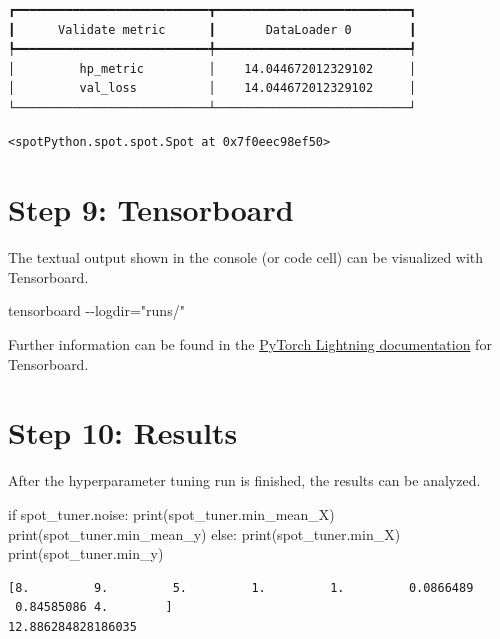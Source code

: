 \documentclass[
  letterpaper,
  DIV=11,
  numbers=noendperiod]{scrreprt}
\newenvironment{Shaded}{\begin{snugshade}}{\end{snugshade}}
\newcommand{\BuiltInTok}[1]{\textcolor[rgb]{0.00,0.23,0.31}{#1}}
\newcommand{\ControlFlowTok}[1]{\textcolor[rgb]{0.00,0.23,0.31}{#1}}
\newcommand{\NormalTok}[1]{\textcolor[rgb]{0.00,0.23,0.31}{#1}}
\begin{document}
\begin{verbatim}
┏━━━━━━━━━━━━━━━━━━━━━━━━━━━┳━━━━━━━━━━━━━━━━━━━━━━━━━━━┓
┃      Validate metric      ┃       DataLoader 0        ┃
┡━━━━━━━━━━━━━━━━━━━━━━━━━━━╇━━━━━━━━━━━━━━━━━━━━━━━━━━━┩
│         hp_metric         │    14.044672012329102     │
│         val_loss          │    14.044672012329102     │
└───────────────────────────┴───────────────────────────┘
\end{verbatim}

\begin{verbatim}
<spotPython.spot.spot.Spot at 0x7f0eec98ef50>
\end{verbatim}

\section{Step 9: Tensorboard}\label{sec-tensorboard-33}

The textual output shown in the console (or code cell) can be visualized
with Tensorboard.

\begin{Shaded}
\begin{Highlighting}[]
\NormalTok{tensorboard {-}{-}logdir="runs/"}
\end{Highlighting}
\end{Shaded}

Further information can be found in the
\href{https://lightning.ai/docs/pytorch/stable/api/lightning.pytorch.loggers.tensorboard.html}{PyTorch
Lightning documentation} for Tensorboard.

\section{Step 10: Results}\label{sec-results-33}

After the hyperparameter tuning run is finished, the results can be
analyzed.

\begin{Shaded}
\begin{Highlighting}[]
\ControlFlowTok{if}\NormalTok{ spot\_tuner.noise:}
    \BuiltInTok{print}\NormalTok{(spot\_tuner.min\_mean\_X)}
    \BuiltInTok{print}\NormalTok{(spot\_tuner.min\_mean\_y)}
\ControlFlowTok{else}\NormalTok{:}
    \BuiltInTok{print}\NormalTok{(spot\_tuner.min\_X)}
    \BuiltInTok{print}\NormalTok{(spot\_tuner.min\_y)}
\end{Highlighting}
\end{Shaded}

\begin{verbatim}
[8.         9.         5.         1.         1.         0.0866489
 0.84585086 4.        ]
12.886284828186035
\end{verbatim}
\end{document}
